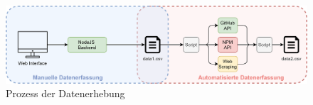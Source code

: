 \begin{figure}[h]
    \centering
    \includegraphics[scale=0.1]{figures/04/DatenerfassungArchitektur.png}
    \caption{Prozess der Datenerhebung}
    \label{abb:Architektur}
\end{figure}




